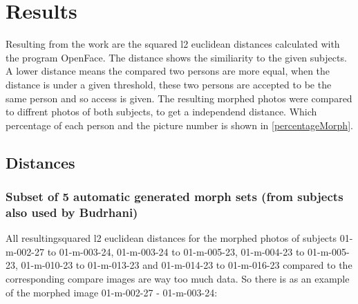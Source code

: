 \section{Results}
Resulting from the work are the squared l2 euclidean distances calculated with the program OpenFace. The distance shows the similiarity to the given subjects. A lower distance means the compared two persons are more equal, when the distance is under a given threshold, these two persons are accepted to be the same person and so access is given. The resulting morphed photos were compared to diffrent photos of both subjects, to get a independend distance. Which percentage of each person and the picture number is shown in \ref{percentageMorph}.
\subsection{Distances}

\subsubsection{Subset of 5 automatic generated morph sets (from subjects also used by Budrhani)}\label{sec:subset5}
All resultingsquared l2 euclidean distances for the morphed photos of subjects 01-m-002-27 to 01-m-003-24, 01-m-003-24 to 01-m-005-23, 01-m-004-23 to 01-m-005-23, 01-m-010-23 to 01-m-013-23 and 01-m-014-23 to 01-m-016-23 compared to the corresponding compare images are way too much data. So there is as an example of the morphed image 01-m-002-27 - 01-m-003-24:

